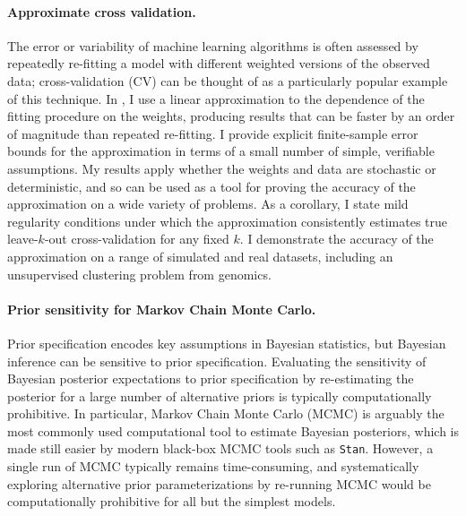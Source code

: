 \paragraph{Approximate cross validation.}
%
The error or variability of machine learning algorithms is often assessed by
repeatedly re-fitting a model with different weighted versions of the observed
data; cross-validation (CV) can be thought of as a particularly popular example
of this technique.
%
In \citet{giordano:2019:ij}, I use a linear approximation to the dependence of
the fitting procedure on the weights, producing results that can be faster by an
order of magnitude than repeated re-fitting. I provide explicit finite-sample
error bounds for the approximation in terms of a small number of simple,
verifiable assumptions.  My results apply whether the weights and data are
stochastic or deterministic, and so can be used as a tool for proving the
accuracy of the approximation on a wide variety of problems. As a
corollary, I state mild regularity conditions under which the approximation
consistently estimates true leave-$k$-out cross-validation for any fixed $k$. I
demonstrate the accuracy of the approximation on a range of simulated and real
datasets, including an unsupervised clustering problem from genomics.


\paragraph{Prior sensitivity for Markov Chain Monte Carlo.}
%
Prior specification encodes key assumptions in Bayesian statistics, but Bayesian
inference can be sensitive to prior specification.  Evaluating the sensitivity
of Bayesian posterior expectations to prior specification by re-estimating the
posterior for a large number of alternative priors is typically computationally
prohibitive.  In particular, Markov Chain Monte Carlo (MCMC) is arguably the
most commonly used computational tool to estimate Bayesian posteriors, which is
made still easier by modern black-box MCMC tools such as \texttt{Stan}.
However, a single run of MCMC typically remains time-consuming, and
systematically exploring alternative prior parameterizations by re-running MCMC
would be computationally prohibitive for all but the simplest models.


